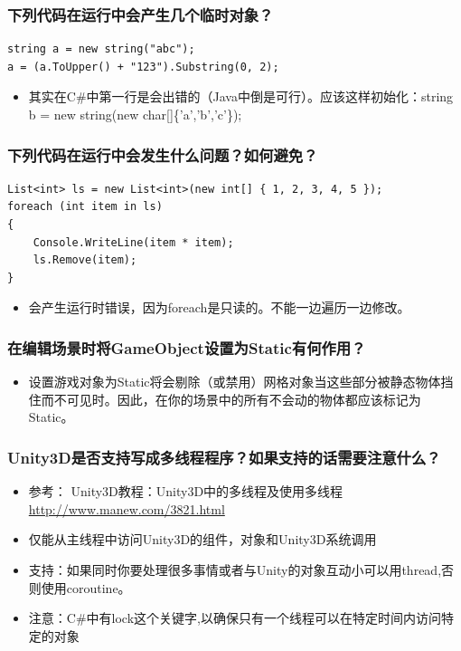 \documentclass[9pt, b5paper]{article}
\begin{document}
\subsubsection{下列代码在运行中会产生几个临时对象？}
\label{sec:org592421b}
\begin{verbatim}
string a = new string("abc");
a = (a.ToUpper() + "123").Substring(0, 2);
\end{verbatim}
\begin{itemize}
\item 其实在C\#中第一行是会出错的（Java中倒是可行）。应该这样初始化：string b = new string(new char[]\{'a','b','c'\});
\end{itemize}
\subsubsection{下列代码在运行中会发生什么问题？如何避免？}
\label{sec:org8268c68}
\begin{verbatim}
List<int> ls = new List<int>(new int[] { 1, 2, 3, 4, 5 });
foreach (int item in ls)
{
    Console.WriteLine(item * item);
    ls.Remove(item);
}
\end{verbatim}
\begin{itemize}
\item 会产生运行时错误，因为foreach是只读的。不能一边遍历一边修改。
\end{itemize}
\subsubsection{在编辑场景时将GameObject设置为Static有何作用？}
\label{sec:org052e94c}
\begin{itemize}
\item 设置游戏对象为Static将会剔除（或禁用）网格对象当这些部分被静态物体挡住而不可见时。因此，在你的场景中的所有不会动的物体都应该标记为Static。
\end{itemize}

\subsubsection{Unity3D是否支持写成多线程程序？如果支持的话需要注意什么？}
\label{sec:org5d6ccb5}
\begin{itemize}
\item 参考： Unity3D教程：Unity3D中的多线程及使用多线程 \url{http://www.manew.com/3821.html}
\item 仅能从主线程中访问Unity3D的组件，对象和Unity3D系统调用
\item 支持：如果同时你要处理很多事情或者与Unity的对象互动小可以用thread,否则使用coroutine。
\item 注意：C\#中有lock这个关键字,以确保只有一个线程可以在特定时间内访问特定的对象
\end{itemize}
\end{document}
